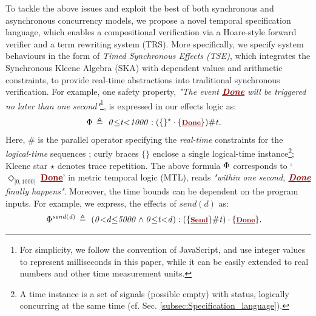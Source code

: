 \documentclass[acmsmall,review,anonymous]{acmart}\settopmatter{printfolios=true,printccs=false,printacmref=false}
\newcommand{\effect}{\textcolor{black}{\ensuremath{\mathrm{\Phi}}}}
\newcommand{\anyevent}[1]{{\textcolor{darkred}
{\underline{\textbf{\footnotesize #1}}}}}
\newcommand{\code}[1]{{\tt{\ensuremath{\m{#1}}}}}
\newcommand{\m}{\mathit}
\def\defeq{\ensuremath{\,\triangleq}}
\newcommand\secref[1]{Sec. \textcolor{black}{\ref{#1}}}
\begin{document}
To tackle the above issues and exploit the best of both synchronous and asynchronous concurrency models, we propose a novel temporal specification language, which enables a compositional verification via a  Hoare-style forward verifier and a term rewriting system (TRS). 
More specifically, we specify system behaviours in the form of \emph{Timed Synchronous Effects (TSE)}, which integrates the Synchronous Kleene Algebra (SKA) \cite{prisacariu2010synchronous,broda2015deciding} with dependent values and arithmetic constraints, 
to 
provide real-time abstractions into traditional synchronous verification. 
For example, one safety property, \textit{"The event \anyevent{Done} will be triggered no later than one second"}\footnote{For simplicity, we  follow the convention of JavaScript, and use integer values to represent milliseconds in this paper, while it can be easily extended to real numbers and other time measurement units.}, is expressed in our effects logic as: 
\begin{align*}
&\code{\effect \defeq \  0 {\leq} t {<}1000 : (\{{\anyevent{}\}^\star} \cdot \{\anyevent{Done}\} ) \# t}.
\end{align*}  
Here, \code{\#} is the parallel operator specifying the \emph{real-time} constraints for the \emph{logical-time} sequences \cite{von2017real}; 
curly braces \code{\{\}} enclose a single  logical-time instance\footnote{A time instance is a set of signals (possible empty) with status, logically concurring at the same time (cf. {\secref{subsec:Specification_language}}).}; 
Kleene star \code{\star} denotes trace repetition.
The above formula \code{\effect} corresponds to `\code{\Diamond_{[0, 1000)}\ }\anyevent{Done}' in metric temporal logic (MTL), reads \textit{"within one second, \anyevent{Done} finally happens"}. Moreover, the time bounds can be dependent on the program inputs. For example, we express, the effects of \code{send(d)} as:
\begin{align*}
&\code{\effect^{send (d)} \defeq \  (0 {<} d {\leq}5000 \wedge  0 {\leq} t {<} d) : (\{{\anyevent{Send}\} \# t)} \cdot \{\anyevent{Done}\}}.
\end{align*}  
\end{document}
